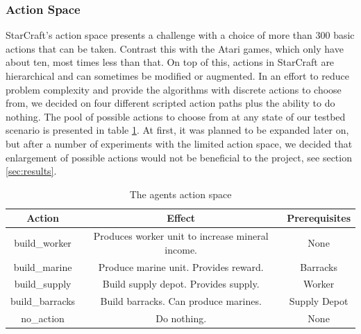 \documentclass[12pt,a4paper]{article}
\begin{document}
\subsubsection{Action Space}\label{sec:action}
StarCraft's action space presents a challenge with a choice of more than 300 basic actions that can be taken. Contrast this with the Atari games, which only have about ten, most times less than that. On top of this, actions in StarCraft are hierarchical and can sometimes be modified or augmented.
In an effort to reduce problem complexity and provide the algorithms with discrete actions to choose from, we decided on four different scripted action paths plus the ability to do nothing. The pool of possible actions to choose from at any state of our testbed scenario is presented in table \ref{tab:actions}. At first, it was planned to be expanded later on, but after a number of experiments with the limited action space, we decided that enlargement of possible actions would not be beneficial to the project, see section \ref{sec:results}.
\begin{table}
    \begin{center}
        \begin{tabular}{ c | c | c }
            {\bf Action} & {\bf Effect} & {\bf Prerequisites} \\
            \hline
            build\_worker & Produces worker unit to increase mineral income. & None \\ 
            build\_marine & Produce marine unit. Provides reward. & Barracks \\  
            build\_supply & Build supply depot. Provides supply. & Worker \\
            build\_barracks & Build barracks. Can produce marines. & Supply Depot \\
            no\_action & Do nothing. & None    
        \end{tabular}
    \end{center}
    \caption{The agents action space}
    \label{tab:actions}
\end{table}
\end{document}
